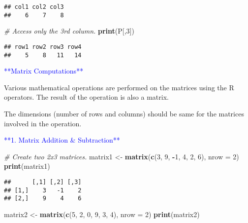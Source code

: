 \documentclass[
]{article}
\newenvironment{Shaded}{\begin{snugshade}}{\end{snugshade}}
\newcommand{\AttributeTok}[1]{\textcolor[rgb]{0.13,0.29,0.53}{#1}}
\newcommand{\CommentTok}[1]{\textcolor[rgb]{0.56,0.35,0.01}{\textit{#1}}}
\newcommand{\DecValTok}[1]{\textcolor[rgb]{0.00,0.00,0.81}{#1}}
\newcommand{\FunctionTok}[1]{\textcolor[rgb]{0.13,0.29,0.53}{\textbf{#1}}}
\newcommand{\NormalTok}[1]{#1}
\newcommand{\OtherTok}[1]{\textcolor[rgb]{0.56,0.35,0.01}{#1}}
\newcommand{\SpecialCharTok}[1]{\textcolor[rgb]{0.81,0.36,0.00}{\textbf{#1}}}
\begin{document}
\begin{verbatim}
## col1 col2 col3 
##    6    7    8
\end{verbatim}

\begin{Shaded}
\begin{Highlighting}[]
\CommentTok{\# Access only the 3rd column.}
\FunctionTok{print}\NormalTok{(P[,}\DecValTok{3}\NormalTok{])}
\end{Highlighting}
\end{Shaded}

\begin{verbatim}
## row1 row2 row3 row4 
##    5    8   11   14
\end{verbatim}

\textcolor{blue}{**Matrix Computations**}

Various mathematical operations are performed on the matrices using the
R operators. The result of the operation is also a matrix.

The dimensions (number of rows and columns) should be same for the
matrices involved in the operation.

\textcolor{blue}{**1. Matrix Addition & Subtraction**}

\begin{Shaded}
\begin{Highlighting}[]
\CommentTok{\# Create two 2x3 matrices.}
\NormalTok{matrix1 }\OtherTok{\textless{}{-}} \FunctionTok{matrix}\NormalTok{(}\FunctionTok{c}\NormalTok{(}\DecValTok{3}\NormalTok{, }\DecValTok{9}\NormalTok{, }\SpecialCharTok{{-}}\DecValTok{1}\NormalTok{, }\DecValTok{4}\NormalTok{, }\DecValTok{2}\NormalTok{, }\DecValTok{6}\NormalTok{), }\AttributeTok{nrow =} \DecValTok{2}\NormalTok{)}
\FunctionTok{print}\NormalTok{(matrix1)}
\end{Highlighting}
\end{Shaded}

\begin{verbatim}
##      [,1] [,2] [,3]
## [1,]    3   -1    2
## [2,]    9    4    6
\end{verbatim}

\begin{Shaded}
\begin{Highlighting}[]
\NormalTok{matrix2 }\OtherTok{\textless{}{-}} \FunctionTok{matrix}\NormalTok{(}\FunctionTok{c}\NormalTok{(}\DecValTok{5}\NormalTok{, }\DecValTok{2}\NormalTok{, }\DecValTok{0}\NormalTok{, }\DecValTok{9}\NormalTok{, }\DecValTok{3}\NormalTok{, }\DecValTok{4}\NormalTok{), }\AttributeTok{nrow =} \DecValTok{2}\NormalTok{)}
\FunctionTok{print}\NormalTok{(matrix2)}
\end{Highlighting}
\end{Shaded}
\end{document}
